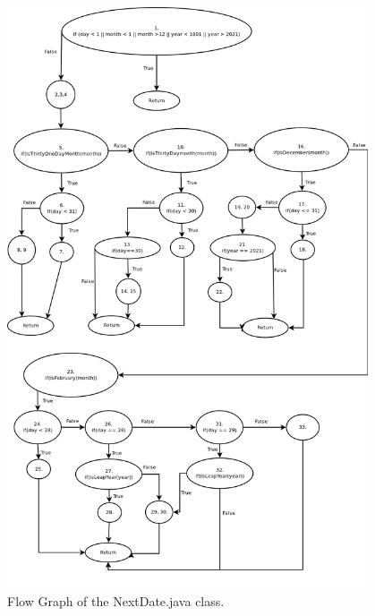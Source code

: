 \begin{figure}[!ht]
\begin{center}
	\includegraphics[width=0.95\textwidth]{flowgraph.png}
\end{center}
\caption{Flow Graph of the NextDate.java class.}
\label{flowgraphpic}
\end{figure}